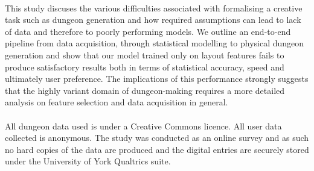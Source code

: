 \documentclass{UoYCSproject}
\begin{document}
\begin{summary}
\paragraph{}
This study discuses the various difficulties associated with formalising a creative task such as dungeon generation and how required assumptions can lead to lack of data and therefore to poorly performing models.
We outline an end-to-end pipeline from data acquisition, through statistical modelling to physical dungeon generation and show that our model trained only on layout features fails to produce satisfactory results both in terms of statistical accuracy, speed and ultimately user preference. The implications of this performance strongly suggests that the highly variant domain of dungeon-making requires a more detailed analysis on feature selection and data acquisition in general.
\paragraph{}
All dungeon data used is under a Creative Commons licence. All user data collected is anonymous. The study was conducted as an online survey and as such no hard copies of the data are produced and the digital entries are securely stored under the University of York Qualtrics suite.




\end{summary}
\end{document}
